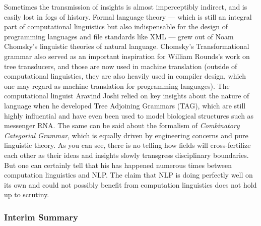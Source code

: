 Sometimes the transmission of insights is almost imperceptibly indirect, and is easily lost in fogs of history.
Formal language theory --- which is still an integral part of computational linguistics but also indispensable for the design of programming languages and file standards like XML --- grew out of Noam Chomsky's linguistic theories of natural language.
Chomsky's Transformational grammar also served as an important inspiration for William Rounds's work on tree transducers, and those are now used in machine translation (outside of computational linguistics, they are also heavily used in compiler design, which one may regard as machine translation for programming languages).
The computational linguist Aravind Joshi relied on key insights about the nature of language when he developed Tree Adjoining Grammars (TAG), which are still highly influential and have even been used to model biological structures such as messenger RNA\@.
The same can be said about the formalism of \emph{Combinatory Categorial Grammar}, which is equally driven by engineering concerns and pure linguistic theory.
As you can see, there is no telling how fields will cross-fertilize each other as their ideas and insights slowly transgress disciplinary boundaries.
But one can certainly tell that his has happened numerous times between computation linguistics and NLP.
The claim that NLP is doing perfectly well on its own and could not possibly benefit from computation linguistics does not hold up to scrutiny.

\subsubsection{Interim Summary}
\label{sub:formal_arguments_practical_summary}

